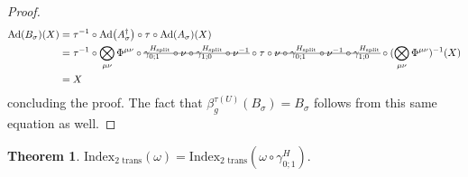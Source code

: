 \documentclass[12pt,a4paper,twoside]{article}
\newcommand{\stkout}[1]{\ifmmode\text{\sout{\ensuremath{#1}}}\else\sout{#1}\fi}
\let\originalleft\left
\let\originalright\right
\renewcommand{\left}{\mathopen{}\mathclose\bgroup\originalleft}
\renewcommand{\right}{\aftergroup\egroup\originalright}
\newcommand{\Ad}[1]{\textrm{Ad}\left(#1\right)}
\theoremstyle{definition}
\newtheorem{theorem}{Theorem}[section]
\numberwithin{equation}{section}
\begin{document}
\begin{proof}
	\begin{align}
		\Ad{B_\sigma}(X)&=\tau^{-1}\circ\Ad{A_\sigma^\dagger}\circ\tau\circ\Ad{A_\sigma}(X)\\
		&=\tau^{-1}\circ\bigotimes_{\mu\nu}\Phi^{\mu\nu}\circ\stkout{\gamma^{H_\text{split}}_{0;1}\circ\nu\circ \gamma^{H_\text{split}}_{1;0}\circ\nu^{-1}}\circ\tau\circ\stkout{\nu\circ\gamma^{H_\text{split}}_{0;1}\circ\nu^{-1}\circ\gamma^{H_\text{split}}_{1;0}}\circ(\bigotimes_{\mu\nu}\Phi^{\mu\nu})^{-1}(X)\\
		&=X
	\end{align}
	concluding the proof. The fact that $\beta_g^{\tau(U)}(B_\sigma)=B_\sigma$ follows from this same equation as well.
\end{proof}
\begin{theorem}
	$\textrm{Index}_{\text{2 trans}}(\omega)=\textrm{Index}_{\text{2 trans}}(\omega\circ\gamma^H_{0;1}).$
\end{theorem}
\end{document}
